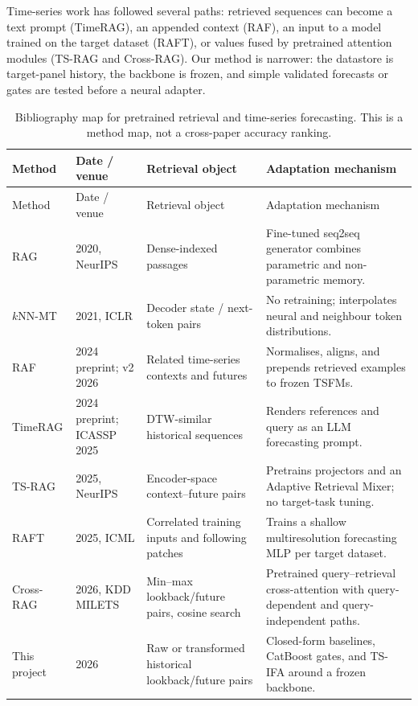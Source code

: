 \documentclass[10pt]{article}
\begin{document}
Time-series work has followed several paths: retrieved sequences can become a
text prompt (TimeRAG), an appended context (RAF), an input to a model trained on
the target dataset (RAFT), or values fused by pretrained attention modules
(TS-RAG and Cross-RAG). Our method is narrower: the datastore is target-panel
history, the backbone is frozen, and simple validated forecasts or gates are
tested before a neural adapter.

\small
\begin{longtable}{@{}p{.12\linewidth}p{.13\linewidth}p{.25\linewidth}p{.42\linewidth}@{}}
\caption{Bibliography map for pretrained retrieval and time-series forecasting.
This is a method map, not a cross-paper accuracy ranking.}
\label{tab:bibliography-map}\\
\toprule
Method & Date / venue & Retrieval object & Adaptation mechanism \\
\midrule
\endfirsthead
\toprule
Method & Date / venue & Retrieval object & Adaptation mechanism \\
\midrule
\endhead
RAG \citep{lewis2020rag}
& 2020, NeurIPS
& Dense-indexed passages
& Fine-tuned seq2seq generator combines parametric and non-parametric memory. \\
$k$NN-MT \citep{khandelwal2021knnmt}
& 2021, ICLR
& Decoder state / next-token pairs
& No retraining; interpolates neural and neighbour token distributions. \\
RAF \citep{tire2024raf}
& 2024 preprint; v2 2026
& Related time-series contexts and futures
& Normalises, aligns, and prepends retrieved examples to frozen TSFMs. \\
TimeRAG \citep{yang2024timerag}
& 2024 preprint; ICASSP 2025
& DTW-similar historical sequences
& Renders references and query as an LLM forecasting prompt. \\
TS-RAG \citep{ning2025tsrag}
& 2025, NeurIPS
& Encoder-space context--future pairs
& Pretrains projectors and an Adaptive Retrieval Mixer; no target-task tuning. \\
RAFT \citep{han2025raft}
& 2025, ICML
& Correlated training inputs and following patches
& Trains a shallow multiresolution forecasting MLP per target dataset. \\
Cross-RAG \citep{lee2026crossrag}
& 2026, KDD MILETS
& Min--max lookback/future pairs, cosine search
& Pretrained query--retrieval cross-attention with query-dependent and
query-independent paths. \\
This project
& 2026
& Raw or transformed historical lookback/future pairs
& Closed-form baselines, CatBoost gates, and TS-IFA around a frozen backbone. \\
\bottomrule
\end{longtable}
\normalsize
\end{document}

